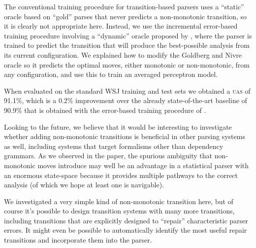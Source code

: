 \documentclass[11pt,letterpaper]{article}
\newcommand{\uas}{\textsc{uas}\xspace}
\begin{document}
The conventional training procedure for transition-based parsers uses a ``static'' oracle
based on ``gold'' parses that never predicts a non-monotonic transition, so it is clearly not
appropriate here.  Instead, we use the incremental error-based training procedure involving
a ``dynamic'' oracle proposed by  \citet{goldberg:12}, where the parser is trained to
predict the transition that will produce
the best-possible analysis from its current configuration.  We explained how to modify the Goldberg
and Nivre oracle so it predicts the optimal moves, either monotonic or non-monotonic,
from any configuration, and use this to train an averaged perceptron model.

When evaluated on the standard WSJ training and test sets we obtained a \uas of 91.1\%,
which is a 0.2\% improvement over the already state-of-the-art baseline of
90.9\% that is obtained with the error-based training procedure
of \citet{goldberg:12}.

Looking to the future, we believe that it would be interesting to investigate whether
adding non-monotonic transitions is beneficial in other parsing systems as well, including
systems that target formalisms other than dependency grammars.  As we observed
in the paper, the spurious ambiguity that non-monotonic moves introduce may well be an
advantage in a statistical parser with an enormous state-space because it provides
multiple pathways to the correct analysis (of which we hope at least one is navigable).

We investigated a very simple kind of non-monotonic transition here, but of course it's
possible to design transition systems with many more transitions, including transitions
that are explicitly designed to ``repair'' characteristic parser errors.  It might even
be possible to automatically identify the most useful repair transitions and incorporate them
into the parser.



\end{document}
